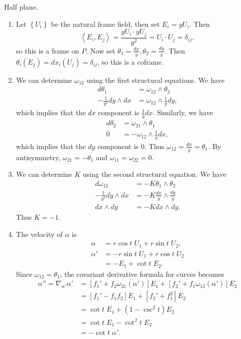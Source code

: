 \documentclass[twoside,10pt]{report}
\begin{document}
\newpage
\begin{exer}[]
Half plane.
\end{exer}
\begin{enumerate}
	\item Let $\left\{ U_i \right\}$ be the natural frame field, then set $E_i = yU_i$. Then
		\[
		\left\langle E_i,E_j \right\rangle = \frac{yU_i \cdot yU_j}{y^2} = U_i \cdot U_j = \delta_{ij},
	\] so this is a frame on $P$. Now set $\theta_1 = \frac{dx}{y} ,\theta_2=\frac{dy}{y} $. Then $\theta_i(E_j) = dx_{i}(U_{j}) = \delta_{ij}$, so this is a coframe.

\item We can determine $\omega_{12}$ using the first structural equations. We have
	\begin{align*}
		d\theta_1 &= \omega_{12}\wedge \theta_2 \\
		-\frac{1}{y^{2}} dy \wedge dx &= \omega_{12}\wedge \frac{1}{y} dy,
	\end{align*}which implies that the $dx$ component is $\frac{1}{y} dx$. Similarly, we have
	\begin{align*}
		d\theta_2&=\omega_{21}\wedge \theta_1\\
		0&=-\omega_{12}\wedge \frac{1}{y} dx,
	\end{align*}which implies that the $dy$ component is 0. Thus $\omega_{12}=\frac{dx}{y} =\theta_1$. By antisymmetry, $\omega_{21}=-\theta_1$ and $\omega_{11}=\omega_{22}=0$.

	\item We can determine $K$ using the second structural equation. We have
		\begin{align*}
			d\omega_{12}&=-K\theta_1\wedge \theta_2\\
			-\frac{1}{y^2} dy\wedge dx &=-K \frac{dx}{y} \wedge \frac{dy}{y} \\
			dx\wedge dy &= -Kdx\wedge dy.
		\end{align*}Thus $K=-1$.

	\item The velocity of $\alpha$ is
		\begin{align*}
			\alpha &= r \cos t \;U_1 + r \sin t \;U_2, \\
			\alpha' &= -r \sin t \;U_1 + r \cos t \;U_2 \\
				&= -E_1 + \cot t \;E_2.
		\end{align*}
		Since $\omega_{12}=\theta_1$, the covariant derivative formula for curves becomes
		\begin{align*}
			\alpha''=\nabla_{\alpha'}\alpha' &= \left[ f_1'+f_2 \omega_{21}(\alpha') \right]E_1 + \left[ f_2'+f_1\omega_{12}(\alpha') \right]E_2 \\
						&= \left[ f_1'-f_1f_2 \right]E_1+ \left[ f_2'+f_1^2 \right]E_2 \\
						&= \cot t\; E_1 + (1-\csc^2 t) E_2 \\
						&= \cot t\; E_1 - \cot^2 t \;E_2 \\
						&= -\cot t \;\alpha'.
		\end{align*}


\end{enumerate}
\end{document}
